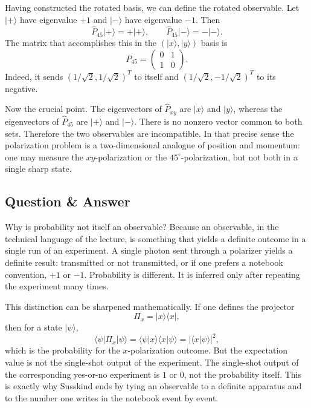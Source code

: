 Having constructed the rotated basis, we can define the rotated observable. Let \(|+\rangle\) have eigenvalue \(+1\) and \(|-\rangle\) have eigenvalue \(-1\). Then
\begin{equation}
\hat P_{45}|+\rangle=+|+\rangle,
\qquad
\hat P_{45}|-\rangle=-|-\rangle.
\end{equation}
The matrix that accomplishes this in the \((|x\rangle,|y\rangle)\) basis is
\begin{equation}
\hat P_{45}=
\begin{pmatrix}
0 & 1\\
1 & 0
\end{pmatrix}.
\end{equation}
Indeed, it sends \((1/\sqrt2,1/\sqrt2)^T\) to itself and \((1/\sqrt2,-1/\sqrt2)^T\) to its negative.

Now the crucial point. The eigenvectors of \(\hat P_{xy}\) are \(|x\rangle\) and \(|y\rangle\), whereas the eigenvectors of \(\hat P_{45}\) are \(|+\rangle\) and \(|-\rangle\). There is no nonzero vector common to both sets. Therefore the two observables are incompatible. In that precise sense the polarization problem is a two-dimensional analogue of position and momentum: one may measure the \(xy\)-polarization or the \(45^\circ\)-polarization, but not both in a single sharp state.

\subsection{Question \& Answer}

Why is probability not itself an observable? Because an observable, in the technical language of the lecture, is something that yields a definite outcome in a single run of an experiment. A single photon sent through a polarizer yields a definite result: transmitted or not transmitted, or if one prefers a notebook convention, \(+1\) or \(-1\). Probability is different. It is inferred only after repeating the experiment many times.

This distinction can be sharpened mathematically. If one defines the projector
\begin{equation}
\Pi_x = |x\rangle\langle x|,
\end{equation}
then for a state \(|\psi\rangle\),
\begin{equation}
\langle \psi|\Pi_x|\psi\rangle
=
\langle \psi|x\rangle\langle x|\psi\rangle
=
|\langle x|\psi\rangle|^2,
\end{equation}
which is the probability for the \(x\)-polarization outcome. But the expectation value is not the single-shot output of the experiment. The single-shot output of the corresponding yes-or-no experiment is \(1\) or \(0\), not the probability itself. This is exactly why Susskind ends by tying an observable to a definite apparatus and to the number one writes in the notebook event by event.

